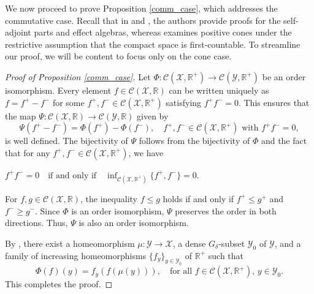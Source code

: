 \documentclass[12pt]{amsart}
\theoremstyle{definition}
\theoremstyle{remark}
\numberwithin{equation}{section}
\begin{document}
We now proceed to prove Proposition \ref{comm_case}, which addresses the commutative case. Recall that in \cite[Theorem 1]{sanchez} and \cite[Theorem 2.1]{Ehsani}, the authors provide proofs for the self-adjoint parts and effect algebras, whereas \cite{Marovt} examines positive cones under the restrictive assumption that the compact space is first-countable. To streamline our proof, we will be content to focus only on the cone case.
\begin{proof}[Proof of Proposition \ref{comm_case}]
	Let $\Phi: \mathcal{C}(\mathcal{X}, \mathbb{R}^+) \to \mathcal{C}(\mathcal{Y}, \mathbb{R}^+)$ be an order isomorphism. Every element $f \in  \mathcal{C}(\mathcal{X}, \mathbb{R})$ can be written uniquely as $f = f^+ - f^-$ for some $f^+, f^- \in \mathcal{C}(\mathcal{X}, \mathbb{R}^+)$ satisfying $f^+f^- = 0$. This ensures that the map  $\Psi: \mathcal{C}(\mathcal{X}, \mathbb{R}) \to \mathcal{C}(\mathcal{Y}, \mathbb{R})$ given by  
	$$
	\Psi(f^+ - f^-) = \Phi(f^+) - \Phi(f^-), \quad f^+, f^- \in \mathcal{C}(\mathcal{X}, \mathbb{R}^+) \text{ with } f^+f^- = 0,
	$$
	is well defined.  The bijectivity of $\Psi$ follows from the bijectivity of $\Phi$ and the fact that for any $f^+, f^- \in \mathcal{C}( \mathcal{X}, \mathbb{R}^+)$, we have  
	\begin{center}
		$f^+f^- = 0 \quad \text{if and only if} \quad \inf_{\mathcal{C}( \mathcal{X}, \mathbb{R}^+)}\{f^+, f^-\} = 0.$	
	\end{center}
	For $f, g \in \mathcal{C}(\mathcal{X}, \mathbb{R})$, the inequality $f \leq g$ holds if and only if $f^+ \leq g^+$ and $f^- \geq g^-$. Since $\Phi$ is an order isomorphism, $\Psi$ preserves the order in both directions. Thus, $\Psi$ is also an order isomorphism.  
	
	By \cite[Theorem 1]{sanchez}, there exist a homeomorphism $\mu: \mathcal{Y} \to \mathcal{X}$, a dense $G_\delta$-subset $\mathcal{Y}_0$  of $\mathcal{Y}$, and a family of increasing homeomorphisms $\{f_y\}_{y \in \mathcal{Y}_0}$ of $\mathbb{R}^+$ such that  
	$$
	\Phi(f)(y) = f_y\left(f(\mu(y))\right), \quad \text{for all } f \in \mathcal{C}(\mathcal{X}, \mathbb{R}^+), \, y \in \mathcal{Y}_0.
	$$
	This completes the proof.
\end{proof}
\end{document}
